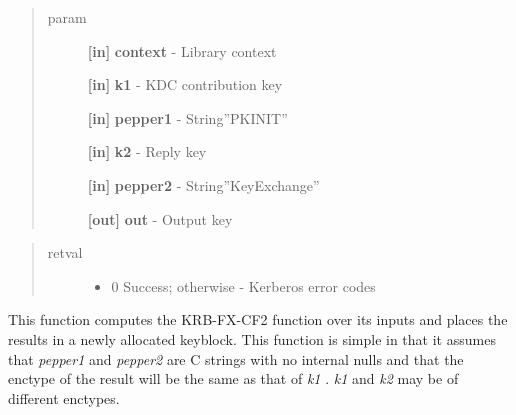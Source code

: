 \documentclass[letterpaper,10pt,english]{sphinxmanual}
\begin{document}
\begin{fulllineitems}
\label{appdev/refs/api/krb5_c_fx_cf2_simple:c.krb5_c_fx_cf2_simple}
\end{fulllineitems}

\begin{quote}\begin{description}
\item[{param}] \leavevmode
\textbf{{[}in{]}} \textbf{context} - Library context

\textbf{{[}in{]}} \textbf{k1} - KDC contribution key

\textbf{{[}in{]}} \textbf{pepper1} - String''PKINIT''

\textbf{{[}in{]}} \textbf{k2} - Reply key

\textbf{{[}in{]}} \textbf{pepper2} - String''KeyExchange''

\textbf{{[}out{]}} \textbf{out} - Output key

\end{description}\end{quote}
\begin{quote}\begin{description}
\item[{retval}] \leavevmode\begin{itemize}
\item {} 
0   Success; otherwise - Kerberos error codes

\end{itemize}

\end{description}\end{quote}

This function computes the KRB-FX-CF2 function over its inputs and places the results in a newly allocated keyblock. This function is simple in that it assumes that \emph{pepper1} and \emph{pepper2} are C strings with no internal nulls and that the enctype of the result will be the same as that of \emph{k1} . \emph{k1} and \emph{k2} may be of different enctypes.
\end{document}
